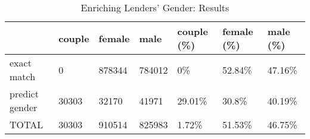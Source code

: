 \begin{table}[ht]
\centering
\begin{tabular}{lllllll}
  \hline
 & couple & female & male & couple (\%) & female (\%) & male (\%) \\ 
  \hline
exact match & 0 & 878344 & 784012 & 0\% & 52.84\% & 47.16\% \\ 
  predict gender & 30303 & 32170 & 41971 & 29.01\% & 30.8\% & 40.19\% \\ 
  TOTAL & 30303 & 910514 & 825983 & 1.72\% & 51.53\% & 46.75\% \\ 
   \hline
\end{tabular}
\caption{Enriching Lenders' Gender: Results} 
\label{tab:lenders_gender}
\end{table}
